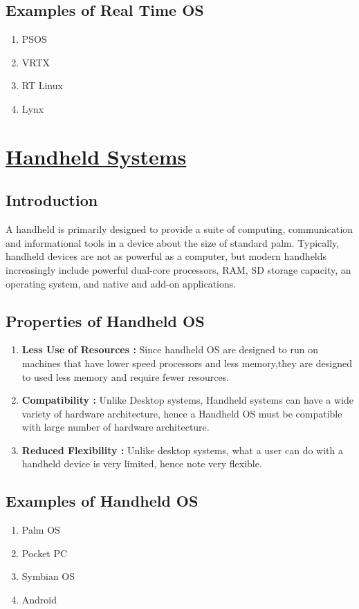 \documentclass{article}
\begin{document}
\subsection{Examples of Real Time OS}
\begin{enumerate}
    \item PSOS
    \item VRTX
    \item RT Linux
    \item Lynx
\end{enumerate}
\section{\underline{Handheld Systems}}
\subsection{Introduction}
A handheld is primarily designed to provide a suite of computing, communication and informational tools in a device about the size of standard palm. Typically, handheld devices are not as powerful as a computer, but modern handhelds increasingly include powerful dual-core processors, RAM, SD storage capacity, an operating system, and native and add-on applications.
\subsection{Properties of Handheld OS}
\begin{enumerate}
    \item \textbf{Less Use of Resources :} Since handheld OS are designed to run on machines that have lower speed processors and less memory,they are designed to used less memory and require fewer resources.
    \item \textbf{Compatibility :} Unlike Desktop systems, Handheld systems can have a wide variety of hardware architecture, hence a Handheld OS must be compatible with large number of hardware architecture.
    \item \textbf{Reduced Flexibility :} Unlike desktop systems, what a user can do with a handheld device is very limited, hence note very flexible.
\end{enumerate}
\subsection{Examples of Handheld OS}
\begin{enumerate}
    \item Palm OS
    \item Pocket PC
    \item Symbian OS
    \item Android
\end{enumerate}
\end{document}
